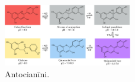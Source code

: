 \documentclass[12pt,a4paper]{article}
\begin{document}
\begin{figure}[H]
    \centering
    \includegraphics[width=0.5\textwidth]{atteli/antocianini.jpg}
    \caption{Antocianīni.}
    \label{fig:antocianini}
\end{figure}
\end{document}

